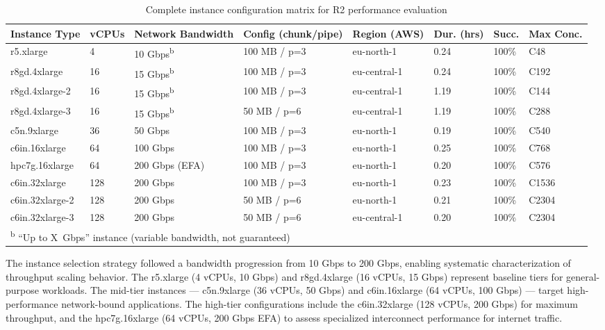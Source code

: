 \begin{table}[H]
\centering
\caption{Complete instance configuration matrix for R2 performance evaluation}
\label{tab:instance-config-summary}
\footnotesize
\begin{tabular}{p{2.5cm}p{0.9cm}p{2.2cm}p{2.2cm}p{1.8cm}p{0.9cm}p{0.8cm}p{1cm}}
\hline
\textbf{Instance Type} & \textbf{vCPUs} & \textbf{Network \newline Bandwidth} & \textbf{Config (chunk/pipe)} & \textbf{Region (AWS)} & \textbf{Dur. (hrs)} & \textbf{Succ.} & \textbf{Max Conc.} \\
\hline
r5.xlarge       & 4   & 10 Gbps\textsuperscript{b} & 100 MB / p=3 & eu-north-1  & 0.24 & 100\% & C48 \\
r8gd.4xlarge    & 16  & 15 Gbps\textsuperscript{b} & 100 MB / p=3 & eu-central-1  & 0.24 & 100\% & C192 \\
r8gd.4xlarge-2  & 16  & 15 Gbps\textsuperscript{b} & 100 MB / p=3 & eu-central-1  & 1.19 & 100\% & C144 \\
r8gd.4xlarge-3  & 16  & 15 Gbps\textsuperscript{b} & 50 MB / p=6  & eu-central-1  & 1.19 & 100\% & C288 \\
c5n.9xlarge     & 36  & 50 Gbps          & 100 MB / p=3 & eu-north-1  & 0.19 & 100\% & C540 \\
c6in.16xlarge   & 64  & 100 Gbps         & 100 MB / p=3 & eu-north-1  & 0.25 & 100\% & C768 \\
hpc7g.16xlarge  & 64  & 200 Gbps (EFA)   & 100 MB / p=3 & eu-north-1  & 0.20 & 100\% & C576 \\
c6in.32xlarge   & 128 & 200 Gbps         & 100 MB / p=3 & eu-north-1  & 0.23 & 100\% & C1536 \\
c6in.32xlarge-2 & 128 & 200 Gbps         & 50 MB / p=6  & eu-north-1  & 0.21 & 100\% & C2304 \\
c6in.32xlarge-3 & 128 & 200 Gbps         & 50 MB / p=6  & eu-central-1 & 0.20 & 100\% & C2304 \\
\hline
\multicolumn{8}{l}{\textsuperscript{b} ``Up to X~Gbps'' instance (variable bandwidth, not guaranteed)} \\
\end{tabular}
\end{table}

The instance selection strategy followed a bandwidth progression from 10 Gbps to 200 Gbps, enabling systematic characterization of throughput scaling behavior. The r5.xlarge (4 vCPUs, 10 Gbps) and r8gd.4xlarge (16 vCPUs, 15 Gbps) represent baseline tiers for general-purpose workloads. The mid-tier instances --- c5n.9xlarge (36 vCPUs, 50 Gbps) and c6in.16xlarge (64 vCPUs, 100 Gbps) --- target high-performance network-bound applications. The high-tier configurations include the c6in.32xlarge (128 vCPUs, 200 Gbps) for maximum throughput, and the hpc7g.16xlarge (64 vCPUs, 200 Gbps EFA) to assess specialized interconnect performance for internet traffic.

